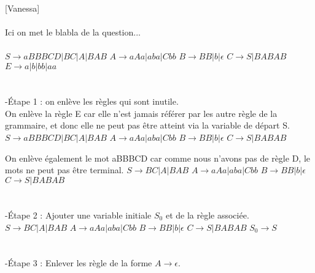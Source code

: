 \documentclass{article}
\begin{document}
[Vanessa]\\
\\
Ici on met le blabla de la question... \\
\\
\newline $S \rightarrow aBBBCD|BC|A|BAB$
\newline $A \rightarrow aAa|aba|Cbb$
\newline $B \rightarrow BB|b|\epsilon$
\newline $C \rightarrow S|BABAB$
\newline $E \rightarrow a|b|bb|aa$
\\
\\
\\
-Étape 1 : on enlève les règles qui sont inutile.\\

On enlève la règle E car elle n'est jamais référer par les autre règle de la grammaire, et donc elle ne peut pas être atteint via la variable de départ S.\\
\newline $S \rightarrow aBBBCD|BC|A|BAB$
\newline $A \rightarrow aAa|aba|Cbb$
\newline $B \rightarrow BB|b|\epsilon$
\newline $C \rightarrow S|BABAB$


On enlève également le mot aBBBCD car comme nous n'avons pas de règle D, le mots ne peut pas être terminal.
\newline $S \rightarrow BC|A|BAB$
\newline $A \rightarrow aAa|aba|Cbb$
\newline $B \rightarrow BB|b|\epsilon$
\newline $C \rightarrow S|BABAB$
\\
\\
\\
-Étape 2 : Ajouter une variable initiale $S_0$ et de la règle associée.\\
\newline $S \rightarrow BC|A|BAB$
\newline $A \rightarrow aAa|aba|Cbb$
\newline $B \rightarrow BB|b|\epsilon$
\newline $C \rightarrow S|BABAB$
\newline $S_0 \rightarrow S$
\\
\\
\\
-Étape 3 : Enlever les règle de la forme $A \rightarrow \epsilon$.\\
\end{document}
